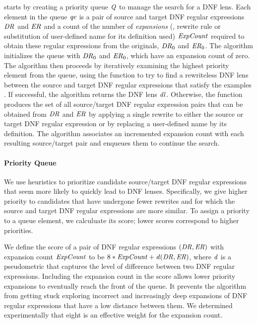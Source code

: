 \documentclass[numbers,10pt,preprint\ifanon ,nocopyrightspace\fi]{sigplanconf}
\begin{document}
\SynthDNFLens{} starts by creating a priority queue $\mathit{Q}$ to manage
  the search for a DNF lens.  Each element in the queue
  $\mathit{qe}$ is a pair of source and target DNF regular
  expressions $\mathit{DR}$ and $\mathit{ER}$ and a count of the number
  of \emph{expansions} (\IE, rewrite rule or substitution of user-defined
name for its definition used)  $\mathit{ExpCount}$
required to obtain these regular
  expressions from the originals, $\mathit{DR}_0$ and
  $\mathit{ER}_0$. The algorithm initializes the queue with
  $\mathit{DR}_0$ and $\mathit{ER}_0$, which have an expansion count of
  zero.  The algorithm then proceeds by iteratively examining the
  highest priority element from the queue, using the
  function \RigidSynth{} to try to find a rewriteless DNF lens
  between the source and target DNF regular expressions that satisfy
  the examples \Examples.  If successful, the algorithm returns the
  DNF lens $\mathit{dl}$.  Otherwise, the function \ExpandOnce{} produces
  the set of all source/target DNF regular expression pairs that can
  be obtained from $\mathit{DR}$ and $\mathit{ER}$ by applying a single
  rewrite to either the source or target DNF regular expression or by
  replacing a user-defined name by its definition.  
  The algorithm associates an incremented expansion count with each
  resulting source/target pair and enqueues them to continue the search.

\paragraph*{Priority Queue}
We use heuristics to prioritize candidate source/target DNF
regular expressions that seem more likely to quickly lead to DNF
lenses.  Specifically, we give higher priority to candidates that have
undergone fewer rewrites and for which the source and target DNF
regular expressions are more similar.  To assign a priority to a queue
element, we calculuate its score; lower scores correspond to higher
priorities. 

We define the score of a pair of DNF regular expressions
$(\mathit{DR}{},\mathit{ER}{})$ with expansion count $\mathit{ExpCount}$ to be
$8*\mathit{ExpCount}+ \mathit{d}(\mathit{DR}{},\mathit{ER}{})$, where
$\mathit{d}$ is a pseudometric that captures the level of difference
between two DNF regular expressions.  Including the expansion count in
the score allows lower priority expansions to eventually reach the
front of the queue. It prevents the algorithm from getting stuck
exploring incorrect and increasingly deep expansions of DNF regular
expressions that have a low distance between them.  We determined
experimentally that eight is an effective weight for the expansion
count.
\end{document}
